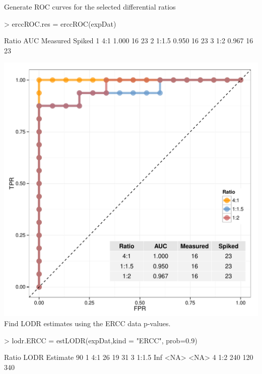 \documentclass{article}
\begin{document}
Generate ROC curves for the selected differential ratios
\begin{Schunk}
\begin{Sinput}
> erccROC.res = erccROC(expDat)
\end{Sinput}
\begin{Soutput}
  Ratio   AUC Measured Spiked
1   4:1 1.000       16     23
2 1:1.5 0.950       16     23
3   1:2 0.967       16     23
\end{Soutput}
\end{Schunk}
\includegraphics{erccdashboardVignetteTry2-erccROC}
Find LODR estimates using the ERCC data p-values.
\begin{Schunk}
\begin{Sinput}
> lodr.ERCC = estLODR(expDat,kind = "ERCC", prob=0.9)
\end{Sinput}
\begin{Soutput}
  Ratio LODR Estimate 90%
1   4:1            26                 19                 31
3 1:1.5           Inf               <NA>               <NA>
4   1:2           240                120                340
\end{Soutput}
\end{Schunk}
\end{document}
